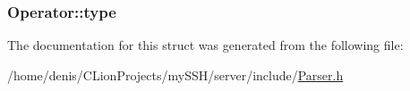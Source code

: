 \subsubsection[{\texorpdfstring{type}{type}}]{ Operator\+::type}\hypertarget{structOperator_a784d9909ad51fd9379c819ea78801c50}{}\label{structOperator_a784d9909ad51fd9379c819ea78801c50}


The documentation for this struct was generated from the following file\+:\begin{DoxyCompactItemize}
\item 
/home/denis/\+C\+Lion\+Projects/my\+S\+S\+H/server/include/\hyperlink{Parser_8h}{Parser.\+h}\end{DoxyCompactItemize}
